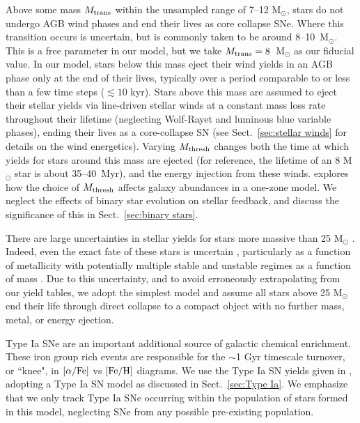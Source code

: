 \documentclass[twocolumn]{aastex61}
\begin{document}
Above some mass $M_{\rm trans}$ within the unsampled range of 7--12 M$_{\odot}$, stars do not undergo AGB wind phases and end their lives as core collapse SNe. Where this transition occurs is uncertain, but is commonly taken to be around 8--10~M$_{\odot}$. This is a free parameter in our model, but we take $M_{\rm trans} = 8$~M$_{\odot}$ as our fiducial value. In our model, stars below this mass eject their wind yields in an AGB phase only at the end of their lives, typically over a period comparable to or less than a few time steps ($\lesssim 10$ kyr). Stars above this mass are assumed to eject their stellar yields via line-driven stellar winds at a constant mass loss rate throughout their lifetime (neglecting Wolf-Rayet and luminous blue variable phases), ending their lives as a core-collapse SN (see Sect.~\ref{sec:stellar winds} for details on the wind energetics). Varying $M_{\rm thresh}$ changes both the time at which yields for stars around this mass are ejected (for reference, the lifetime of an 8 M$_{\odot}$ star is about 35--40~Myr), and the energy injection from these winds. \citet{Cote2017} explores how the choice of $M_{\rm thresh}$ affects galaxy abundances in a one-zone model. We neglect the effects of binary star evolution on stellar feedback, and discuss the significance of this in Sect.~\ref{sec:binary stars}.

There are large uncertainties in stellar yields for stars more massive than 25 M$_{\odot}$ \citep[see ][and references therein]{Cote2016}. Indeed, even the exact fate of these stars is uncertain \citep[e.g.][]{Woosley2002,Zhang2008,Ugliano2012}, particularly as a function of metallicity \citep{Fryer2012} with potentially multiple stable and unstable regimes as a function of mass \citep{Heger2003}. Due to this uncertainty, and to avoid erroneously extrapolating from our yield tables, we adopt the simplest model and assume all stars above 25 M$_{\odot}$ end their life through direct collapse to a compact object with no further mass, metal, or energy ejection.

Type Ia SNe are an important additional source of galactic chemical enrichment. These iron group rich events are responsible for the $\sim$1 Gyr timescale turnover, or ``knee", in $[\alpha/\rm{Fe}]$ vs $[\rm{Fe}/\rm{H}]$ diagrams. We use the Type Ia SN yields given in \citet{Thielemann1986}, adopting a Type Ia SN model as discussed in Sect.~\ref{sec:Type Ia}. We emphasize that we only track Type Ia SNe occurring within the population of stars formed in this model, neglecting SNe from any possible pre-existing population.
\end{document}
